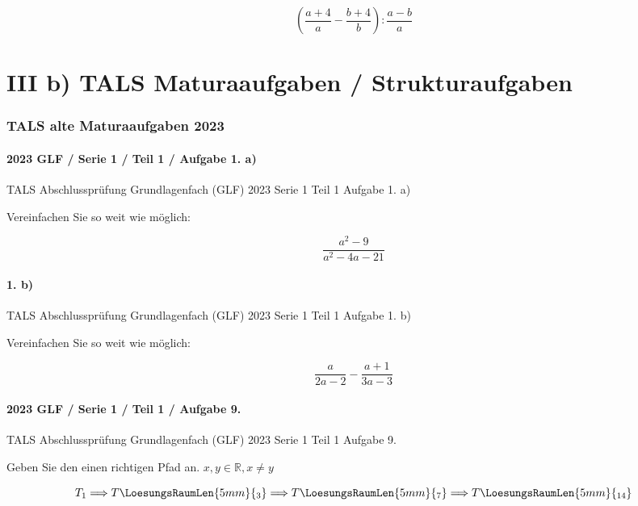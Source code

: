 $$\left(\frac{a+4}a - \frac{b+4}b \right) : \frac{a-b}a$$



\newpage
\part*{III b) TALS Maturaaufgaben / Strukturaufgaben}

\section*{TALS alte Maturaaufgaben 2023}
\subsection*{2023 GLF / Serie 1 / Teil 1 / Aufgabe 1. a)}
TALS Abschlussprüfung Grundlagenfach (GLF) 2023 Serie 1 Teil 1 Aufgabe
1. a)

Vereinfachen Sie so weit wie möglich:

$$\frac{a^2-9}{a^2-4a-21}$$


\subsection*{1. b)}
TALS Abschlussprüfung Grundlagenfach (GLF) 2023 Serie 1 Teil 1 Aufgabe
1. b)

Vereinfachen Sie so weit wie möglich:

$$\frac{a}{2a-2} - \frac{a+1}{3a-3}$$

\subsection*{2023 GLF / Serie 1 / Teil 1 / Aufgabe 9.}
TALS Abschlussprüfung Grundlagenfach (GLF) 2023 Serie 1 Teil 1 Aufgabe
9.

Geben Sie den einen richtigen Pfad an. $x,y \in \mathbb{R}, x\ne y$


$$T_1 \Longrightarrow T\LoesungsRaumLen{5mm}{{}_3} \Longrightarrow
T\LoesungsRaumLen{5mm}{{}_7} \Longrightarrow T\LoesungsRaumLen{5mm}{{}_{14}}$$

